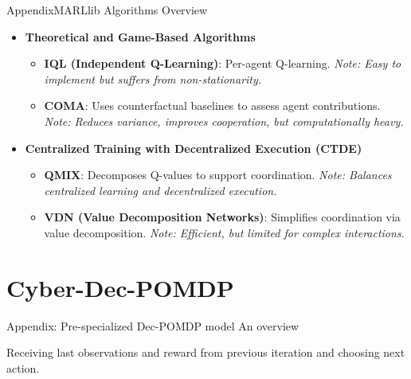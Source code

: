 \begin{frame}[allowframebreaks]{Appendix}{MARLlib Algorithms Overview}
\begin{itemize}
        \item \textbf{Theoretical and Game-Based Algorithms}
              \begin{itemize}
                  \item \textbf{IQL (Independent Q-Learning)}: Per-agent Q-learning.\newline
                        \textit{Note: Easy to implement but suffers from non-stationarity.}
                  \item \textbf{COMA}: Uses counterfactual baselines to assess agent contributions.\newline
                        \textit{Note: Reduces variance, improves cooperation, but computationally heavy.}
              \end{itemize}

        \item \textbf{Centralized Training with Decentralized Execution (CTDE)}
              \begin{itemize}
                  \item \textbf{QMIX}: Decomposes Q-values to support coordination.\newline
                        \textit{Note: Balances centralized learning and decentralized execution.}
                  \item \textbf{VDN (Value Decomposition Networks)}: Simplifies coordination via value decomposition.\newline
                        \textit{Note: Efficient, but limited for complex interactions.}
              \end{itemize}
    \end{itemize}

\end{frame}

\section{Cyber-Dec-POMDP}

\begin{frame}{Appendix: Pre-specialized Dec-POMDP model}
    {An overview}

    Receiving last observations and reward from previous iteration and choosing next action.

    \begin{figure}
        \centering
        
    \end{figure}

\end{frame}

